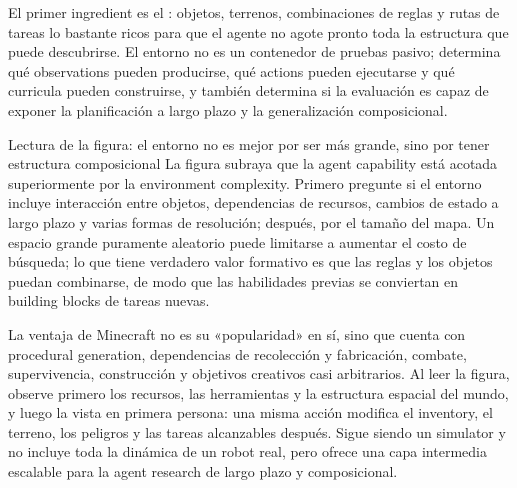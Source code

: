 El primer ingredient es el : objetos, terrenos, combinaciones de reglas y rutas de tareas lo bastante ricos para que el agente no agote pronto toda la estructura que puede descubrirse. El entorno no es un contenedor de pruebas pasivo; determina qué observations pueden producirse, qué actions pueden ejecutarse y qué curricula pueden construirse, y también determina si la evaluación es capaz de exponer la planificación a largo plazo y la generalización composicional.


\begin{knowledgebox}{Lectura de la figura: el entorno no es mejor por ser más grande, sino por tener estructura composicional}
La figura subraya que la agent capability está acotada superiormente por la environment complexity. Primero pregunte si el entorno incluye interacción entre objetos, dependencias de recursos, cambios de estado a largo plazo y varias formas de resolución; después, por el tamaño del mapa. Un espacio grande puramente aleatorio puede limitarse a aumentar el costo de búsqueda; lo que tiene verdadero valor formativo es que las reglas y los objetos puedan combinarse, de modo que las habilidades previas se conviertan en building blocks de tareas nuevas.
\end{knowledgebox}


La ventaja de Minecraft no es su «popularidad» en sí, sino que cuenta con procedural generation, dependencias de recolección y fabricación, combate, supervivencia, construcción y objetivos creativos casi arbitrarios. Al leer la figura, observe primero los recursos, las herramientas y la estructura espacial del mundo, y luego la vista en primera persona: una misma acción modifica el inventory, el terreno, los peligros y las tareas alcanzables después. Sigue siendo un simulator y no incluye toda la dinámica de un robot real, pero ofrece una capa intermedia escalable para la agent research de largo plazo y composicional.


